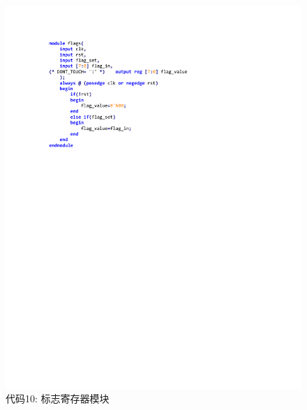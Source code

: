 \documentclass[titlepage, 11pt]{article}
\begin{document}
			\begin{figure}[H]
				\centering
				\includegraphics[scale=1]{32.pdf}
				\caption*{代码10: 标志寄存器模块}
			\end{figure}
\end{document}
